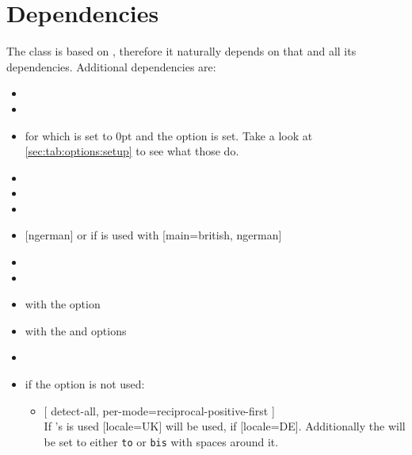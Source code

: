 \section{Dependencies}\label{sec:alone:dep}%
The class is based on , therefore it naturally depends on that
and all its dependencies. Additional dependencies are:
\begin{multicols}{2}%
  \begin{itemize}[leftmargin=10pt]
    \item {}
    \item {}
    \item {} for which  is set to 0pt and the option
       is set. Take a look at \autoref{sec:tab:options:setup} to
      see what those do.
    \item {}
    \item {}
    \item {}
    \item {} [ngerman] or if  is used with
      [main=british, ngerman]
    \item {}
    \item {}
    \item {} with the  option
    \item {} with the  and 
      options
    \item {}
    \item if the  option is not used:
      \begin{itemize}
        \item {}
          [%
            detect-all,
            per-mode=reciprocal-positive-first%
          ]\\
          If 's  is used [locale=UK] will be used, if
           [locale=DE]. Additionally the  will be
          set to either \texttt{to} or \texttt{bis} with spaces around it.
      \end{itemize}
  \end{itemize}
\end{multicols}%
